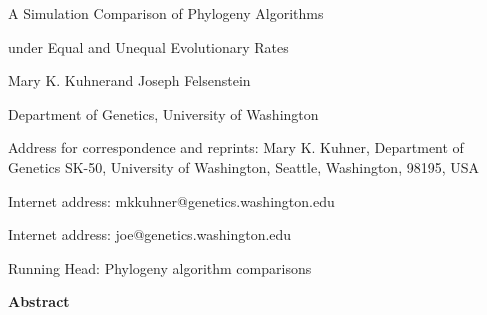 \def\baselinestretch{1.5}
\setlength{\topmargin}{0pt}
\setlength{\textheight}{570pt}
\setlength{\oddsidemargin}{0pt}
\setlength{\evensidemargin}{60pt}
\setlength{\textwidth}{427pt}
\setlength{\footheight}{0pt}
\setlength{\footskip}{30pt}
\parindent 25pt
\pagestyle{article}



\begin{bf}
\vspace{1in}

\centerline{A Simulation Comparison of Phylogeny Algorithms}
\centerline{under Equal and Unequal Evolutionary Rates}
\vspace{1in}

\end{bf}

\centerline{Mary K. Kuhner\footnotemark and Joseph Felsenstein\footnotemark}
\bigskip

\centerline{Department of Genetics, University of Washington}
\vspace{1in}




Address for correspondence and reprints: Mary K. Kuhner,
Department of Genetics SK-50, University of Washington, Seattle, Washington, 98195, USA
\vspace{1in}

\footnotemark[1]Internet address: mkkuhner@genetics.washington.edu
\bigskip

\footnotemark[2]Internet address: joe@genetics.washington.edu

\vspace{1in}

\centerline{Running Head:  Phylogeny algorithm comparisons}

\newpage
{\bf Abstract}


